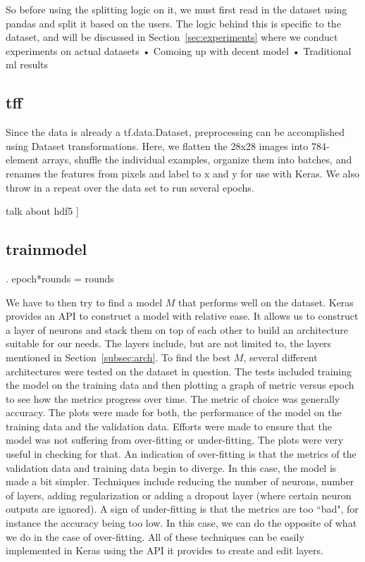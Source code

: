 \documentclass[12pt]{article}
\begin{document}
So before using the splitting logic on it, we must first read in the dataset using pandas and split it based on the users. The logic behind this is specific to the dataset, and will be discussed in Section~\ref{sec:experiments} where we conduct experiments on actual datasets
• Comoing up with decent model
• Traditional ml results
\subsection{tff}
Since the data is already a tf.data.Dataset, preprocessing can be accomplished using Dataset transformations. Here, we flatten the 28x28 images into 784-element arrays, shuffle the individual examples, organize them into batches, and renames the features from pixels and label to x and y for use with Keras. We also throw in a repeat over the data set to run several epochs.

talk about hdf5
]
\subsection{trainmodel}
. epoch*rounds = rounds

We have to then try to find a model $M$ that performs well on the dataset. Keras provides an API to construct a model with relative ease. It allows us to construct a layer of neurons and stack them on top of each other to build an architecture suitable for our needs. The layers include, but are not limited to, the layers mentioned in Section~\ref{subsec:arch}. To find the best $M$, several different architectures were tested on the dataset in question. The tests included training the model on the training data and then plotting a graph of metric versus epoch to see how the metrics progress over time. The metric of choice was generally accuracy. The plots were made for both, the performance of the model on the training data and the validation data. Efforts were made to ensure that the model was not suffering from over-fitting or under-fitting. The plots were very useful in checking for that. An indication of over-fitting is that the metrics of the validation data and training data begin to diverge. In this case, the model is made a bit simpler. Techniques include reducing the number of neurons, number of layers, adding regularization or adding a dropout layer (where certain neuron outputs are ignored). A sign of under-fitting is that the metrics are too ``bad", for instance the accuracy being too low. In this case, we can do the opposite of what we do in the case of over-fitting. All of these techniques can be easily implemented in Keras using the API it provides to create and edit layers. 
\end{document}
